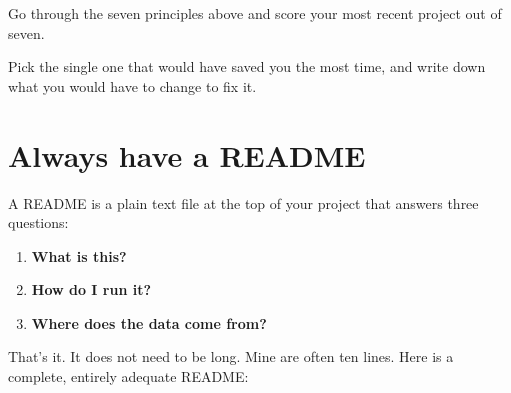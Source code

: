 \documentclass[
  letterpaper,
  justified,
  a4paper]{tufte-book}
\providecommand{\tightlist}{%
  \setlength{\itemsep}{0pt}\setlength{\parskip}{0pt}}
\providecommand{\tightlist}{%
  \setlength{\itemsep}{0pt}\setlength{\parskip}{0pt}}
\begin{document}
\begin{tcolorbox}[enhanced jigsaw, arc=.35mm, bottomrule=.15mm, bottomtitle=1mm, breakable, colback=white, colbacktitle=quarto-callout-note-color!10!white, colframe=quarto-callout-note-color-frame, coltitle=black, left=2mm, leftrule=.75mm, opacityback=0, opacitybacktitle=0.6, rightrule=.15mm, title=\textcolor{quarto-callout-note-color}{\faInfo}\hspace{0.5em}{Your Turn}, titlerule=0mm, toprule=.15mm, toptitle=1mm]

Go through the seven principles above and score your most recent project
out of seven.

Pick the single one that would have saved you the most time, and write
down what you would have to change to fix it.

\end{tcolorbox}

\section{Always have a README}\label{always-have-a-readme}

A README is a plain text file at the top of your project that answers
three questions:

\begin{enumerate}
\def\labelenumi{\arabic{enumi}.}
\tightlist
\item
  \textbf{What is this?}
\item
  \textbf{How do I run it?}
\item
  \textbf{Where does the data come from?}
\end{enumerate}

That's it. It does not need to be long. Mine are often ten lines. Here
is a complete, entirely adequate README:
\end{document}
